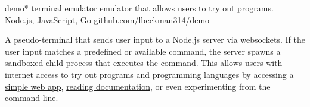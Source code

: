 \showoff
{\textcolor{my-blue}{\href{https://liambeckman.com/code/demo}{demo*}}}
{terminal emulator emulator that allows users to try out programs.}
{Node.js, JavaScript, Go}
{\textcolor{my-blue}{\href{https://github.com/lbeckman314/demo}{github.com/lbeckman314/demo}}}

A pseudo-terminal that sends user input to a Node.js server via websockets. If the user input matches a predefined or available command, the server spawns a sandboxed child process that executes the command. This allows users with internet access to try out programs and programming languages by accessing a \textcolor{my-blue}{\href{https://voyager-index.herokuapp.com}{simple web app}}, \textcolor{my-blue}{\href{https://demo.liambeckman.com/doc-demonstration.html}{reading documentation}}, or even experimenting from the \textcolor{my-blue}{\href{https://github.com/lbeckman314/demo-go.git}{command line}}.

\myBreak
